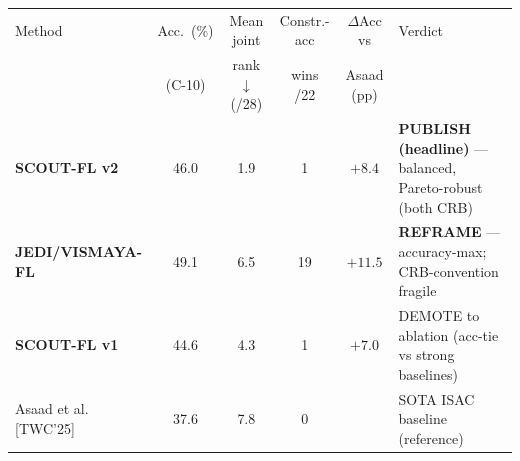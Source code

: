 \begin{tabular}{@{}l c c c c >{\raggedright\arraybackslash}p{5.2cm}@{}}
\toprule
Method & Acc.\ (\%) & Mean joint & Constr.-acc & $\Delta$Acc vs & Verdict \\
 & (C-10) & rank $\downarrow$ (/28) & wins /22 & Asaad (pp) & \\
\midrule
\textbf{SCOUT-FL v2} & 46.0 & 1.9 & 1 & $+8.4$ & \cellcolor{green!14}\textbf{PUBLISH (headline)} --- balanced, Pareto-robust (both CRB) \\
\textbf{JEDI/VISMAYA-FL} & 49.1 & 6.5 & 19 & $+11.5$ & \cellcolor{yellow!18}\textbf{REFRAME} --- accuracy-max; CRB-convention fragile \\
\textbf{SCOUT-FL v1} & 44.6 & 4.3 & 1 & $+7.0$ & \cellcolor{orange!16}DEMOTE to ablation (acc-tie vs strong baselines) \\
\midrule
Asaad et al. [TWC'25] & 37.6 & 7.8 & 0 &  & SOTA ISAC baseline (reference) \\
\bottomrule
\end{tabular}